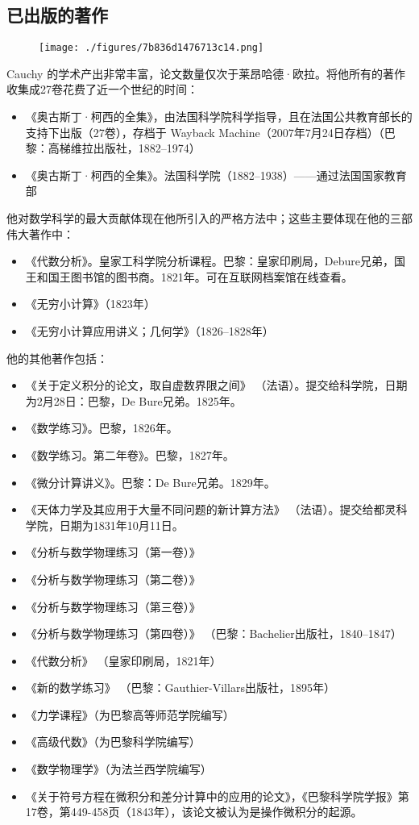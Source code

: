 \subsection{已出版的著作}
\begin{figure}[ht]
\centering
\texttt{[image: ./figures/7b836d1476713c14.png]}
\caption{} \label{fig_August_4}
\end{figure}
Cauchy 的学术产出非常丰富，论文数量仅次于莱昂哈德·欧拉。将他所有的著作收集成27卷花费了近一个世纪的时间：
\begin{itemize}
\item 《奥古斯丁·柯西的全集》，由法国科学院科学指导，且在法国公共教育部长的支持下出版（27卷），存档于 Wayback Machine（2007年7月24日存档）（巴黎：高梯维拉出版社，1882–1974）
\item 《奥古斯丁·柯西的全集》。法国科学院（1882–1938）——通过法国国家教育部
\end{itemize}
他对数学科学的最大贡献体现在他所引入的严格方法中；这些主要体现在他的三部伟大著作中：
\begin{itemize}
\item 《代数分析》。皇家工科学院分析课程。巴黎：皇家印刷局，Debure兄弟，国王和国王图书馆的图书商。1821年。可在互联网档案馆在线查看。
\item 《无穷小计算》（1823年）
\item 《无穷小计算应用讲义；几何学》（1826–1828年）
\end{itemize}
他的其他著作包括：
\begin{itemize}
\item 《关于定义积分的论文，取自虚数界限之间》 （法语）。提交给科学院，日期为2月28日：巴黎，De Bure兄弟。1825年。
\item 《数学练习》。巴黎，1826年。
\item 《数学练习。第二年卷》。巴黎，1827年。
\item 《微分计算讲义》。巴黎：De Bure兄弟。1829年。
\item 《天体力学及其应用于大量不同问题的新计算方法》 （法语）。提交给都灵科学院，日期为1831年10月11日。
\item 《分析与数学物理练习（第一卷）》  
\item 《分析与数学物理练习（第二卷）》  
\item 《分析与数学物理练习（第三卷）》  
\item 《分析与数学物理练习（第四卷）》 （巴黎：Bachelier出版社，1840–1847）  
\item 《代数分析》 （皇家印刷局，1821年）  
\item 《新的数学练习》 （巴黎：Gauthier-Villars出版社，1895年）  
\item 《力学课程》（为巴黎高等师范学院编写）  
\item 《高级代数》（为巴黎科学院编写）  
\item 《数学物理学》（为法兰西学院编写）  
\item 《关于符号方程在微积分和差分计算中的应用的论文》，《巴黎科学院学报》第17卷，第449-458页（1843年），该论文被认为是操作微积分的起源。
\end{itemize}

